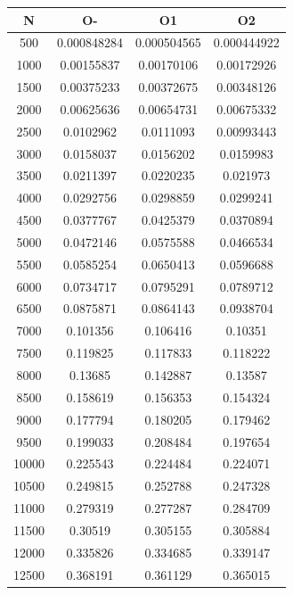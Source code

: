 \begin{center}
\begin{tabular}{| c | c | c | c |}
\hline
\textbf{N} & \textbf{O-} & \textbf{O1} & \textbf{O2} \\ \hline
500 & 0.000848284 & 0.000504565 & 0.000444922 \\ \hline
1000 & 0.00155837 & 0.00170106 & 0.00172926 \\ \hline
1500 & 0.00375233 & 0.00372675 & 0.00348126 \\ \hline
2000 & 0.00625636 & 0.00654731 & 0.00675332 \\ \hline
2500 & 0.0102962 & 0.0111093 & 0.00993443 \\ \hline
3000 & 0.0158037 & 0.0156202 & 0.0159983 \\ \hline
3500 & 0.0211397 & 0.0220235 & 0.021973 \\ \hline
4000 & 0.0292756 & 0.0298859 & 0.0299241 \\ \hline
4500 & 0.0377767 & 0.0425379 & 0.0370894 \\ \hline
5000 & 0.0472146 & 0.0575588 & 0.0466534 \\ \hline
5500 & 0.0585254 & 0.0650413 & 0.0596688 \\ \hline
6000 & 0.0734717 & 0.0795291 & 0.0789712 \\ \hline
6500 & 0.0875871 & 0.0864143 & 0.0938704 \\ \hline
7000 & 0.101356 & 0.106416 & 0.10351 \\ \hline
7500 & 0.119825 & 0.117833 & 0.118222 \\ \hline
8000 & 0.13685 & 0.142887 & 0.13587 \\ \hline
8500 & 0.158619 & 0.156353 & 0.154324 \\ \hline
9000 & 0.177794 & 0.180205 & 0.179462 \\ \hline
9500 & 0.199033 & 0.208484 & 0.197654 \\ \hline
10000 & 0.225543 & 0.224484 & 0.224071 \\ \hline
10500 & 0.249815 & 0.252788 & 0.247328 \\ \hline
11000 & 0.279319 & 0.277287 & 0.284709 \\ \hline
11500 & 0.30519 & 0.305155 & 0.305884 \\ \hline
12000 & 0.335826 & 0.334685 & 0.339147 \\ \hline
12500 & 0.368191 & 0.361129 & 0.365015 \\ \hline
\hline
\end{tabular}
\end{center}